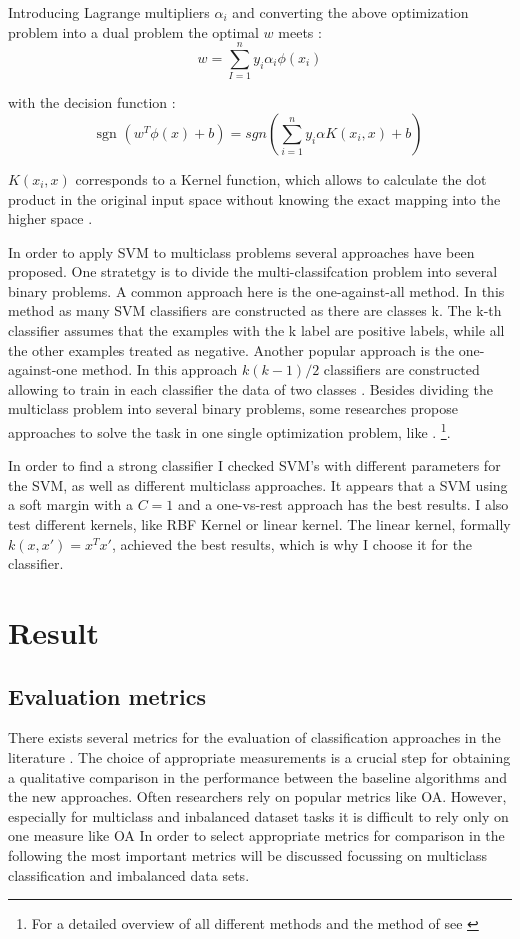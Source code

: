 \documentclass[12pt, a4paper, titlepage]{article}
\begin{document}
Introducing Lagrange multipliers $\alpha_i$ and converting the above optimization problem into a dual problem the optimal $w$ meets \citep{Chang2001, Jordan2006}:
\[w = \sum_{I=1}^n y_i\alpha_i\phi(x_i)\]

with the decision function \citep{Chang2001}:
\[\text{sgn } (w^T\phi(x)+b) = sgn(\sum_{i=1}^n y_i \alpha K(x_i, x) +b)\]

$K(x_i, x)$ corresponds to a Kernel function, which allows to calculate the dot product in the original input space without knowing the exact mapping into the higher space \citep{Han2012, Jordan2006}. 

In order to apply \ac{SVM} to multiclass problems several approaches have been proposed. One stratetgy is to divide the multi-classifcation problem into several binary problems. A common approach here is the one-against-all method. In this method as many \ac{SVM} classifiers are constructed as there are classes k. The k-th classifier assumes that the examples with the k label are positive labels, while all the other examples treated as negative. Another popular approach is the one-against-one method. In this approach $k(k-1)/2$ classifiers are constructed allowing to train in each classifier the data of two classes \citep{Hsu2002}. Besides dividing the multiclass problem into several binary problems, some researches propose approaches to solve the task in one single optimization problem, like \citet{Crammer2001}. \footnote{For a detailed overview of all different methods and the method of \citet{Crammer2001} see \citet{Hsu2002,Crammer2001}}. 

In order to find a strong classifier I checked \ac{SVM}'s with different parameters for the \ac{SVM}, as well as different multiclass approaches. It appears that a SVM using a soft margin with a $C=1$ and a one-vs-rest approach has the best results. I also test different kernels, like  RBF Kernel or linear kernel. The linear kernel, formally  $k(x, x') = x^Tx'$, achieved the best results, which is why I choose it for the classifier. 

\section{Result}
\subsection{Evaluation metrics}
There exists several metrics for the evaluation of classification approaches in the literature \citep{Fatourechi2008}. The choice of appropriate measurements is a crucial step for obtaining a qualitative comparison in the performance between the baseline algorithms and the new approaches. Often researchers rely on popular metrics like \ac{OA}. However, especially for multiclass and inbalanced dataset tasks it is difficult to rely only on one measure like \ac{OA} In order to select appropriate metrics for comparison in the following the most important metrics will be discussed focussing on multiclass classification and imbalanced data sets. 
\end{document}
